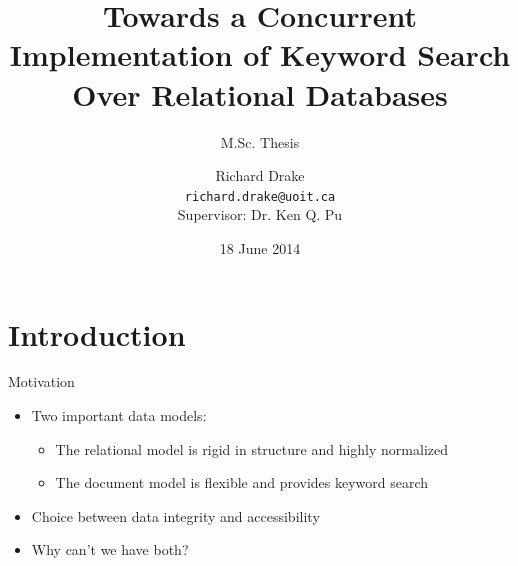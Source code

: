 \documentclass[compress]{beamer}
\title[M.Sc. Thesis -- \insertframenumber/\inserttotalframenumber]{Towards a Concurrent Implementation of Keyword Search Over Relational Databases}
\subtitle{M.Sc. Thesis}
\author[\copyright 2014 Richard Drake]{Richard Drake \\ \vspace{0.3em} \scriptsize{\texttt{richard.drake@uoit.ca}} \\ \vspace{1em} \tiny Supervisor:  Dr. Ken Q. Pu}
\institute[UOIT]{University of Ontario Institute of Technology \\ Oshawa, Ontario, Canada}
\date{\tiny 18 June 2014}
\begin{document}
	
	\frame{\maketitle}
	
	
	\section{Introduction}
		\begin{frame}{Motivation}
			\begin{itemize}
				\item Two important data models:
					\begin{itemize}
						\item The \alert{relational model} is rigid in structure and highly normalized
						\item The \alert{document model} is flexible and provides keyword search
					\end{itemize}
				\item Choice between data \alert{integrity} and \alert{accessibility}
				\item Why can't we have both?
			\end{itemize}
		\end{frame}
		
	
\end{document}
